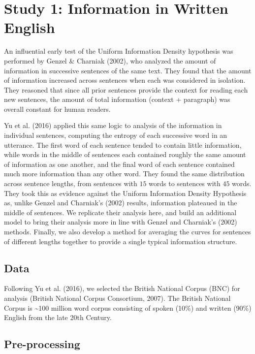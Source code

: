 \documentclass[10pt, letterpaper]{article}
\begin{document}
\hypertarget{study-1-information-in-written-english}{%
\section{Study 1: Information in Written
English}\label{study-1-information-in-written-english}}

An influential early test of the Uniform Information Density hypothesis
was performed by Genzel \& Charniak (2002), who analyzed the amount of
information in successive sentences of the same text. They found that
the amount of information increased across sentences when each was
considered in isolation. They reasoned that since all prior sentences
provide the context for reading each new sentences, the amount of total
information (context + paragraph) was overall constant for human
readers.

Yu et al. (2016) applied this same logic to analysis of the information
in individual sentences, computing the entropy of each successive word
in an utterance. The first word of each sentence tended to contain
little information, while words in the middle of sentences each
contained roughly the same amount of information as one another, and the
final word of each sentence contained much more information than any
other word. They found the same distribution across sentence lengths,
from sentences with \(15\) words to sentences with \(45\) words. They
took this as evidence against the Uniform Information Density Hypothesis
as, unlike Genzel and Charniak's (2002) results, information plateaued
in the middle of sentences. We replicate their analysis here, and build
an additional model to bring their analysis more in line with Genzel and
Charniak's (2002) methods. Finally, we also develop a method for
averaging the curves for sentences of different lengths together to
provide a single typical information structure.

\hypertarget{data}{%
\subsection{Data}\label{data}}

Following Yu et al. (2016), we selected the British National Corpus
(BNC) for analysis (British National Corpus Consortium, 2007). The
British National Corpus is \textasciitilde{}100 million word corpus
consisting of spoken (10\%) and written (90\%) English from the late
20th Century.

\hypertarget{pre-processing}{%
\subsection{Pre-processing}\label{pre-processing}}
\end{document}

